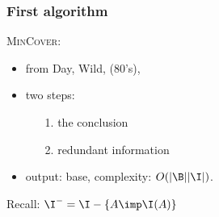 \begin{frame}
\frametitle{First algorithm}

\textsc{MinCover}:
\begin{itemize}
	\item from Day, Wild, (80's),
	
	\vspace{0.8em}
	
	\item two steps:
		\begin{itemize}
			\item[\color{belize} 1.]  the conclusion
			\item[ ] 
			
			\vspace{0.5em}
			
			\item[\color{belize} 2.]  redundant information
			\item[ ] 
		\end{itemize}
	
	\vspace{0.8em}
	
	\item output:  base, complexity: $O(|\B||\I|)$.
\end{itemize}

\vspace{1em}

\begin{lightreminder}
	Recall: $\I^{-} = \I - \{ A \imp \I(A) \}$	
\end{lightreminder}

\end{frame}

